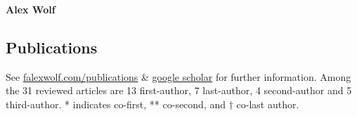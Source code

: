 \documentclass[11pt]{scrartcl}
\def\newline{\\[.4em]}
\begin{document}
\thispagestyle{firstpage}
\pagestyle{fancy}
\vspace*{1em}
\begin{center}\textbf{\LARGE{Alex Wolf}}\end{center}


\setlength\LTleft{0em}
\subsection*{Publications}
See \href{https://falexwolf.com/publications}{falexwolf.com/publications} \& \href{http://scholar.google.de/citations?user=1FnOtMoAAAAJ\&hl=en}{google scholar} for further information. Among the 31 reviewed articles are 13 first-author, 7 last-author, 4 second-author and 5 third-author. * indicates co-first, ** co-second, and $\dagger$ co-last author.
\def\newline{\\[.6em]}


\newpage
\vspace{0em}

\end{document}
